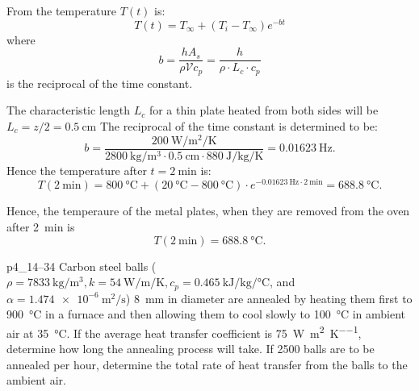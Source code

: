\begin{derivation}
  From  the temperature $T(t)$ is:
  \begin{equation*}
    T(t) = T_{\infty} + \left( T_i - T_{\infty} \right) e^{- b t}
  \end{equation*}
  where
  \begin{equation*}
    b = \frac{h A_s}{\rho \mathscr{V} c_p} = \frac{h}{\rho \cdot L_c \cdot c_p}
  \end{equation*}
  is the reciprocal of the time constant.

  The characteristic length $L_c$ for a thin plate heated from both sides will be $L_c = z / 2 = \qty{0,5}{\cm}$
  The reciprocal of the time constant is determined to be:
  \begin{equation*}
  b = \frac{\qty{200}{\W\per\m\squared\per\K}}{\qty{2800}{\kg\per\m\cubed} \cdot \qty{0,5}{\cm} \cdot \qty{880}{\J\per\kg\per\K} } = \qty{0.01623}{\hertz}
  .\end{equation*}
  Hence the temperature after $t = \qty{2}{\minute}$ is:
  \begin{equation*}
    T(\qty{2}{\minute}) = \qty{800}{\celsius} + \left( \qty{20}{\celsius} - \qty{800}{\celsius} \right) \cdot e^{\qty{-0,01623}{\hertz} \cdot \qty{2}{\minute} } = \qty{688.8}{\celsius}
  .\end{equation*}
\end{derivation}

\begin{finalresult}
  Hence, the temperaure of the metal plates, when they are removed from the oven after \qty{2}{\minute} is
  \begin{equation*}
    T(\qty{2}{\minute}) = \qty{688,8}{\celsius}
  .\end{equation*}
\end{finalresult}

\begin{problemwithimage}{p4_1}{4--34}
  Carbon steel balls ($\rho = \qty{7833}{\kg\per\m\cubed}, k = \qty{54}{\W\per\m\per\K}, c_p = \qty{0,465}{\kJ\per\kg\per\celsius}$, and $\alpha = \qty{1,474e-6}{\m\squared\per\s}$) \qty{8}{\mm} in diameter are annealed by heating them first to \qty{900}{\celsius} in a furnace and then allowing them to cool slowly to \qty{100}{\celsius} in ambient air at \qty{35}{\celsius}.
  If the average heat transfer coefficient is \qty{75}{\W\per\m\squared\per\K}, determine how long the annealing process will take.
  If \num{2500} balls are to be annealed per hour, determine the total rate of heat transfer from the balls to the ambient air.
\end{problemwithimage}

